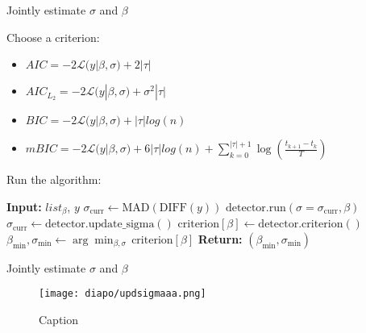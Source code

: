 \documentclass[10pt, xcolor=dvipsnames]{beamer}
\begin{document}
    

\begin{frame}{Jointly estimate $\sigma$ and $\beta$}



Choose a criterion:
\begin{itemize}
    \item $AIC = - 2 \mathcal{L}(y|\beta, \sigma) + 2|\tau|$
    \item $AIC_{L_2} = - 2 \mathcal{L}(y|\beta, \sigma) + \sigma^2|\tau|$
    \item $BIC = - 2 \mathcal{L}(y|\beta, \sigma) + |\tau|log(n)$
    \item $mBIC = - 2 \mathcal{L}(y|\beta, \sigma) + 6|\tau|log(n) + \sum_{k=0}^{|\tau|+1} \log \left( \frac{t_{k+1} - t_k}{T} \right)$
\end{itemize}

Run the algorithm:
\begin{algorithmic}
\State \textbf{Input:} $list_{\beta}$, $y$
\State $ \sigma_{\text{curr}} \gets \text{MAD}(\text{DIFF}(y)) $
    \State $\text{detector.run}(\sigma = \sigma_{\text{curr}}, \beta)$
    \State $ \sigma_{\text{curr}} \gets \text{detector.update\_sigma}() $
    \State $ \text{criterion}[\beta] \gets \text{detector.criterion}() $
\EndFor
\State $\beta_{\text{min}}, \sigma_{\text{min}} \gets \arg\min_{\beta, \sigma} \, \text{criterion}[\beta]$
\State \textbf{Return:} $ (\beta_{\text{min}}, \sigma_{\text{min}}) $
\end{algorithmic}
    
\end{frame}

\begin{frame}{Jointly estimate $\sigma$ and $\beta$}



    \begin{figure}
        \centering
        \texttt{[image: diapo/updsigmaaa.png]}
        \caption{Caption}
        \label{fig:enter-label}
    \end{figure}
\end{frame}
\end{document}
